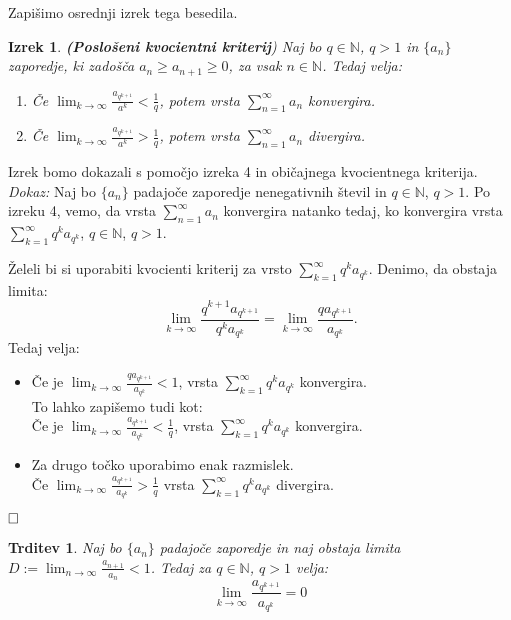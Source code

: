 \documentclass[a4paper,12pt]{article}
\def\N{\mathbb{N}} %
\def\qed{$\hfill\Box$}   %
\newtheorem{izrek}{Izrek}
\newtheorem{trditev}{Trditev}
\begin{document}
Zapišimo osrednji izrek tega besedila.

\begin{izrek}\textbf{(Poslošeni kvocientni kriterij})
    Naj bo $q \in \N$, $q > 1$ in $\{a_n\}$ zaporedje,
    ki zadošča $a_{n} \geq a_{n+1} \geq 0$, za vsak $n \in \N$.
    Tedaj velja:
    
    \begin{enumerate}
        \item Če $\lim_{k \to \infty}{\frac{a_{q^{k + 1}}}{a^k}} < \frac{1}{q}$,
        potem vrsta $\sum_{n = 1}^{\infty}{a_n}$ konvergira.
        \item Če $\lim_{k \to \infty}{\frac{a_{q^{k + 1}}}{a^k}} > \frac{1}{q}$,
        potem vrsta $\sum_{n = 1}^{\infty}{a_n}$ divergira.
    \end{enumerate}
\end{izrek}

\noindent
Izrek bomo dokazali s pomočjo izreka 4 in običajnega kvocientnega kriterija.\\
\noindent
{\em Dokaz:\/} Naj bo $\{a_n\}$ padajoče zaporedje nenegativnih števil in $ q \in {\mathbb{N}}$, $q > 1$.
Po izreku 4, vemo, da vrsta $\sum_{n = 1}^{\infty}{a_n}$ konvergira natanko tedaj, ko konvergira vrsta
$\sum_{k = 1}^{\infty}{q^ka_{q^k}}$, $q \in {\mathbb{N}}$, $q > 1$.

Želeli bi si uporabiti kvocienti kriterij za vrsto $\sum_{k = 1}^{\infty}{q^ka_{q^k}}$.
Denimo, da obstaja limita:
\[ 
    \lim_{k \to \infty}{\frac{q^{k + 1}a_{q^{k + 1}}}{q^ka_{q^k}}}  =
    \lim_{k \to \infty}{\frac{qa_{q^{k + 1}}}{a_{q^k}}}  
    \text{.}
\]
Tedaj velja:
\begin{itemize}
    \item Če je $\lim_{k \to \infty}{\frac{qa_{q^{k + 1}}}{a_{q^k}}} < 1$, vrsta $\sum_{k = 1}^{\infty}{q^ka_{q^k}}$ konvergira.\\
    To lahko zapišemo tudi kot:\\
    Če je $\lim_{k \to \infty}{\frac{a_{q^{k + 1}}}{a_{q^k}}} < \frac{1}{q}$, vrsta $\sum_{k = 1}^{\infty}{q^ka_{q^k}}$ konvergira.
    \item Za drugo točko uporabimo enak razmislek.\\
    Če $\lim_{k \to \infty}{\frac{a_{q^{k + 1}}}{a_{q^k}}} > \frac{1}{q}$
    vrsta $\sum_{k = 1}^{\infty}{q^ka_{q^k}}$ divergira. 
\end{itemize}
\qed


\begin{trditev}
    Naj bo $\{a_{n}\}$ padajoče zaporedje in naj obstaja limita
    $D := \lim_{n \to \infty}{\frac{a_{n + 1}}{a_n}} < 1$. Tedaj za $q \in {\mathbb{N}}$, $q > 1$ velja:
    \[
        \lim_{k \to \infty}{\frac{a_{q^{k + 1}}}{a_{q^k}}} = 0
    \]
\end{trditev}
\end{document}
